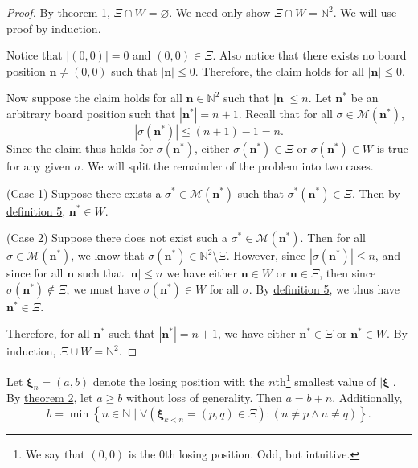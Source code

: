 \documentclass[11pt, letterpaper]{article}
\begin{document}
\begin{proof}
	By \hyperref[thm:1]{theorem 1},  $\Xi \cap W=\varnothing$. We need only show $\Xi \cap W=\mathbb{N}^2$. We will use proof by induction.

	Notice that $\left| (0,0) \right| =0$ and $(0,0)\in \Xi $. Also notice that there exists no board position $\mathbf{n}\neq (0,0)$ such that $\left| \mathbf{n} \right| \leq 0$. Therefore, the claim holds for all $\left| \mathbf{n} \right| \leq 0$.

	Now suppose the claim holds for all $\mathbf{n}\in\mathbb{N}^2$ such that $\left| \mathbf{n} \right| \leq n$. Let $\mathbf{n}^*$ be an arbitrary board position such that $\left| \mathbf{n}^* \right| =n+1$. Recall that for all $\sigma \in \mathscr{M} \left( \mathbf{n}^* \right) $,
	\[
		\left| \sigma \left( \mathbf{n}^* \right)  \right| \leq (n+1)-1=n
	.\]
	Since the claim thus holds for $\sigma \left( \mathbf{n}^* \right) $, either $\sigma \left( \mathbf{n}^* \right) \in \Xi $ or $\sigma \left( \mathbf{n}^* \right) \in W$ is true for any given $\sigma $. We will split the remainder of the problem into two cases.

	(Case 1) Suppose there exists a $\sigma^*\in \mathscr{M} \left( \mathbf{n}^* \right) $ such that $\sigma ^*\left( \mathbf{n}^* \right) \in \Xi $. Then by \hyperref[dfn:5]{definition 5}, $\mathbf{n}^*\in W$.

	(Case 2) Suppose there does not exist such a $\sigma ^*\in \mathscr{M} \left( \mathbf{n}^* \right) $. Then for all $\sigma \in \mathscr{M} \left( \mathbf{n}^* \right) $, we know that $\sigma \left( \mathbf{n}^* \right) \in\mathbb{N}^2\setminus \Xi $. However, since $\left| \sigma \left( \mathbf{n}^* \right)  \right| \leq n$, and since for all $\mathbf{n}$ such that $\left| \mathbf{n} \right| \leq n$ we have either $\mathbf{n}\in W$ or $\mathbf{n}\in \Xi $, then since $\sigma \left( \mathbf{n}^* \right) \notin \Xi $, we must have $\sigma \left( \mathbf{n}^* \right) \in W$ for all $\sigma $. By \hyperref[dfn:5]{definition 5}, we thus have $\mathbf{n}^*\in \Xi $.

	Therefore, for all $\mathbf{n}^*$ such that $\left| \mathbf{n}^* \right| =n+1$, we have either $\mathbf{n}^*\in \Xi $ or $\mathbf{n}^*\in W$. By induction, $\Xi \cup W=\mathbb{N}^2$.
\end{proof}
\begin{theorem}\label{thm:4}
	Let $\boldsymbol{\xi} _n=(a,b)$ denote the losing position with the $n$th\footnote{We say that $(0,0)$ is the 0th losing position. Odd, but intuitive.} smallest value of $\left| \boldsymbol{\xi}  \right| $. By \hyperref[thm:2]{theorem 2}, let $a\geq b$ without loss of generality. Then $a=b+n$. Additionally,
	\[
		b=\min  \left\{ n\in\mathbb{N} \mid \forall (\boldsymbol{\xi}_{k<n}=(p,q)\in \Xi ):(n\neq p\land n\neq q) \right\} 
	.\]
\end{theorem}
\end{document}
